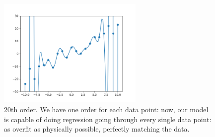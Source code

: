                  \begin{figure}[H]
                    \centering
                    
                    \includegraphics[width=70mm,scale=0.5]{images/feature_images/order_20_soln.png}
                    \caption*{20th order. We have one order for each data point: now, our model is capable of doing regression going through every single data point: as overfit as physically possible, perfectly matching the data.}
                \end{figure}